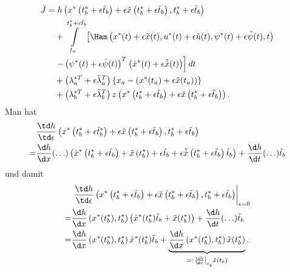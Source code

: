 \begin{align*}
	\begin{split}
		\bar{J} & = h\left(x^{\ast}\left(t_b^{\ast}+\epsilon\tilde{t}_b \right) +\epsilon\tilde{x}\left(t_b^{\ast}+\epsilon\tilde{t}_b \right),
		t_b^{\ast}+\epsilon\tilde{t}_b \right)\\
		& \quad + \int\limits_{t_a}^{t_b^{\ast}+\epsilon\tilde{t}_b}\left[\Ham\left(x^{\ast}(t)+\epsilon\tilde{x}(t), u^{\ast}(t)+\epsilon\tilde{u}(t),
		\psi^{\ast}(t)+\epsilon\tilde{\psi}(t),t \right) \right.\\
		& \left. \quad - \left(\psi^{\ast}(t)+\epsilon\tilde{\psi}(t) \right)^T\left(\dot{x}^{\ast}(t)+\epsilon\tilde{\dot{x}}(t) \right)\right]dt\\
		& \quad + \left(\lambda_a^{\ast T}+\epsilon\tilde{\lambda}_a^T \right)\left\{x_a - \left(x^{\ast}(t_a)+\epsilon\tilde{x}(t_a)\right) \right\}\\
		& \quad + \left(\lambda_b^{\ast T}+\epsilon\tilde{\lambda}_b^T \right)z\left(x^{\ast}\left(t_b^{\ast}+\epsilon\tilde{t}_b \right) +
		\epsilon\tilde{x}\left(t_b^{\ast} + \epsilon\tilde{t}_b \right) \right).
	\end{split}
\end{align*}
Man hat
\begin{align*}
	& \frac{\td h}{\td\epsilon}\left(x^{\ast}\left(t_b^{\ast}+\epsilon\tilde{t}_b^{\ast} \right) + \epsilon\tilde{x}\left(t_b^{\ast}+ \epsilon\tilde{t}_b
	\right),t_b^{\ast} + \epsilon\tilde{t}_b \right)\\
	=  & \frac{\d h}{\d x}(\ldots)\left(\dot{x}^{\ast}\left(t_b^{\ast}+\epsilon\tilde{t}_b \right)+\tilde{x}\left(t_b^{\ast}\right)+\epsilon\tilde{t}_b +
	\epsilon\tilde{\dot{x}} \left(t_b^{\ast}+\epsilon\tilde{t}_b \right)\tilde{t}_b \right) + \frac{\d h}{\d t}(\ldots)\tilde{t}_b
\end{align*}
und damit
\begin{align*}
	& \left.\frac{\td h}{\td\epsilon}\left(x^{\ast}\left(t_b^{\ast}+\epsilon\tilde{t}_b \right) + \epsilon\tilde{x}\left(t_b^{\ast}+\epsilon\tilde{t}_b 
	\right),t_b^{\ast}+\epsilon\tilde{t}_b \right)\right|_{\epsilon = 0}\\
	= & \frac{\d h}{\d x}\left(x^{\ast}(t_b^{\ast}),t_b^{\ast} \right)\left(\dot{x}^{\ast}(t_b^{\ast})\tilde{t}_b + \tilde{x}(t_b^{\ast}) \right) +
	\frac{\d h}{\d t}(\ldots)\tilde{t}_b\\
	= & \frac{\d h}{\d x}\left(x^{\ast}(t_b^{\ast}),t_b^{\ast} \right)\dot{x}^{\ast}(t_b^{\ast})\tilde{t}_b + \underbrace{\frac{\d h}{\d
	x}\left(x^{\ast}(t_b^{\ast}),t_b^{\ast} \right)\tilde{x}(t_b^{\ast}) }_{=:\left.\frac{\d h}{\d x}\right|_{t_b} \tilde{x}(t_b)}.
\end{align*}
